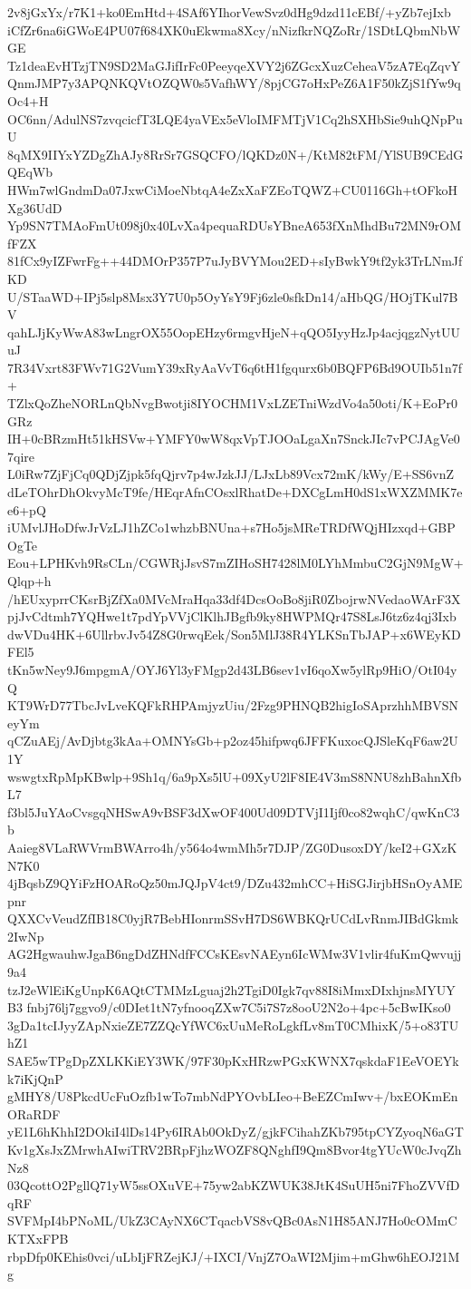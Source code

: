 2v8jGxYx/r7K1+ko0EmHtd+4SAf6YIhorVewSvz0dHg9dzd11cEBf/+yZb7ejIxb
iCfZr6na6iGWoE4PU07f684XK0uEkwma8Xcy/nNizfkrNQZoRr/1SDtLQbmNbWGE
Tz1deaEvHTzjTN9SD2MaGJifIrFc0PeeyqeXVY2j6ZGcxXuzCeheaV5zA7EqZqvY
QnmJMP7y3APQNKQVtOZQW0s5VafhWY/8pjCG7oHxPeZ6A1F50kZjS1fYw9qOc4+H
OC6nn/AdulNS7zvqcicfT3LQE4yaVEx5eVloIMFMTjV1Cq2hSXHbSie9uhQNpPuU
8qMX9IIYxYZDgZhAJy8RrSr7GSQCFO/lQKDz0N+/KtM82tFM/YlSUB9CEdGQEqWb
HWm7wlGndmDa07JxwCiMoeNbtqA4eZxXaFZEoTQWZ+CU0116Gh+tOFkoHXg36UdD
Yp9SN7TMAoFmUt098j0x40LvXa4pequaRDUsYBneA653fXnMhdBu72MN9rOMfFZX
81fCx9yIZFwrFg++44DMOrP357P7uJyBVYMou2ED+sIyBwkY9tf2yk3TrLNmJfKD
U/STaaWD+IPj5slp8Msx3Y7U0p5OyYsY9Fj6zle0sfkDn14/aHbQG/HOjTKul7BV
qahLJjKyWwA83wLngrOX55OopEHzy6rmgvHjeN+qQO5IyyHzJp4acjqgzNytUUuJ
7R34Vxrt83FWv71G2VumY39xRyAaVvT6q6tH1fgqurx6b0BQFP6Bd9OUIb51n7f+
TZlxQoZheNORLnQbNvgBwotji8IYOCHM1VxLZETniWzdVo4a50oti/K+EoPr0GRz
IH+0cBRzmHt51kHSVw+YMFY0wW8qxVpTJOOaLgaXn7SnckJIc7vPCJAgVe07qire
L0iRw7ZjFjCq0QDjZjpk5fqQjrv7p4wJzkJJ/LJxLb89Vcx72mK/kWy/E+SS6vnZ
dLeTOhrDhOkvyMcT9fe/HEqrAfnCOsxlRhatDe+DXCgLmH0dS1xWXZMMK7ee6+pQ
iUMvlJHoDfwJrVzLJ1hZCo1whzbBNUna+s7Ho5jsMReTRDfWQjHIzxqd+GBPOgTe
Eou+LPHKvh9RsCLn/CGWRjJsvS7mZIHoSH7428lM0LYhMmbuC2GjN9MgW+Qlqp+h
/hEUxyprrCKsrBjZfXa0MVcMraHqa33df4DcsOoBo8jiR0ZbojrwNVedaoWArF3X
pjJvCdtmh7YQHwe1t7pdYpVVjClKlhJBgfb9ky8HWPMQr47S8LsJ6tz6z4qj3Ixb
dwVDu4HK+6UllrbvJv54Z8G0rwqEek/Son5MlJ38R4YLKSnTbJAP+x6WEyKDFEl5
tKn5wNey9J6mpgmA/OYJ6Yl3yFMgp2d43LB6sev1vI6qoXw5ylRp9HiO/OtI04yQ
KT9WrD77TbcJvLveKQFkRHPAmjyzUiu/2Fzg9PHNQB2higIoSAprzhhMBVSNeyYm
qCZuAEj/AvDjbtg3kAa+OMNYsGb+p2oz45hifpwq6JFFKuxocQJSleKqF6aw2U1Y
wswgtxRpMpKBwlp+9Sh1q/6a9pXs5lU+09XyU2lF8IE4V3mS8NNU8zhBahnXfbL7
f3bl5JuYAoCvsgqNHSwA9vBSF3dXwOF400Ud09DTVjI1Ijf0co82wqhC/qwKnC3b
Aaieg8VLaRWVrmBWArro4h/y564o4wmMh5r7DJP/ZG0DusoxDY/keI2+GXzKN7K0
4jBqsbZ9QYiFzHOARoQz50mJQJpV4ct9/DZu432mhCC+HiSGJirjbHSnOyAMEpnr
QXXCvVeudZfIB18C0yjR7BebHIonrmSSvH7DS6WBKQrUCdLvRnmJIBdGkmk2IwNp
AG2HgwauhwJgaB6ngDdZHNdfFCCsKEsvNAEyn6IcWMw3V1vlir4fuKmQwvujj9a4
tzJ2eWlEiKgUnpK6AQtCTMMzLguaj2h2TgiD0Igk7qv88I8iMmxDIxhjnsMYUYB3
fnbj76lj7ggvo9/c0DIet1tN7yfnooqZXw7C5i7S7z8ooU2N2o+4pc+5cBwIKso0
3gDa1tcIJyyZApNxieZE7ZZQcYfWC6xUuMeRoLgkfLv8mT0CMhixK/5+o83TUhZ1
SAE5wTPgDpZXLKKiEY3WK/97F30pKxHRzwPGxKWNX7qskdaF1EeVOEYkk7iKjQnP
gMHY8/U8PkcdUcFuOzfb1wTo7mbNdPYOvbLIeo+BeEZCmIwv+/bxEOKmEnORaRDF
yE1L6hKhhI2DOkiI4lDs14Py6IRAb0OkDyZ/gjkFCihahZKb795tpCYZyoqN6aGT
Kv1gXsJxZMrwhAIwiTRV2BRpFjhzWOZF8QNghfI9Qm8Bvor4tgYUcW0cJvqZhNz8
03QcottO2PgllQ71yW5ssOXuVE+75yw2abKZWUK38JtK4SuUH5ni7FhoZVVfDqRF
SVFMpI4bPNoML/UkZ3CAyNX6CTqacbVS8vQBc0AsN1H85ANJ7Ho0cOMmCKTXxFPB
rbpDfp0KEhis0vci/uLbIjFRZejKJ/+IXCI/VnjZ7OaWI2Mjim+mGhw6hEOJ21Mg
